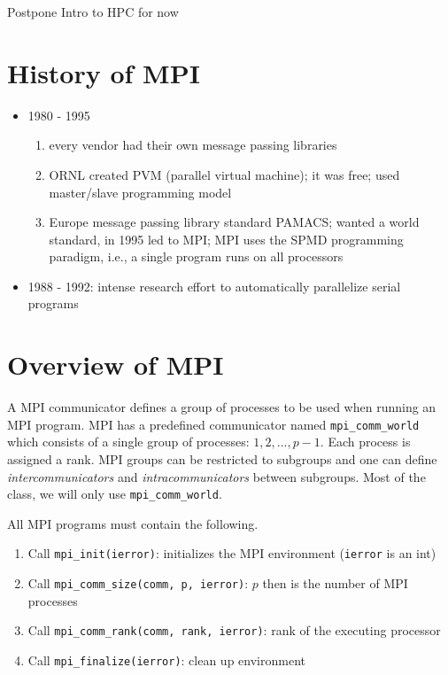 \documentclass[10pt]{article}
\newenvironment{mitemize}
{
  \begin{itemize}
  \setlength{\itemsep}{1pt}
  \setlength{\parskip}{0pt}
  \setlength{\parsep}{0pt}}{\end{itemize}
}
\newenvironment{menumerate}
{
  \begin{enumerate}
  \setlength{\itemsep}{1pt}
  \setlength{\parskip}{0pt}
  \setlength{\parsep}{0pt}}{\end{enumerate}
}
\begin{document}
Postpone Intro to HPC for now

\section{History of MPI}
\begin{mitemize}
  \item 1980 - 1995
  \begin{menumerate}
    \item every vendor had their own message passing libraries
    \item ORNL created PVM (parallel virtual machine); it was free; used master/slave programming model
    \item Europe message passing library standard PAMACS; wanted a world standard, in 1995 led to MPI; MPI uses the SPMD programming paradigm, i.e., a single program runs on all processors
  \end{menumerate}
  \item 1988 - 1992: intense research effort to automatically parallelize serial programs
\end{mitemize}

\section{Overview of MPI}

A MPI communicator defines a group of processes to be used when running an MPI program. MPI has a predefined communicator named \texttt{mpi\_comm\_world} which consists of a single group of processes: $1,2,...,p-1$. Each process is assigned a rank. MPI groups can be restricted to subgroups and one can define \textit{intercommunicators} and \textit{intracommunicators} between subgroups. Most of the class, we will only use \texttt{mpi\_comm\_world}.

All MPI programs must contain the following.
\begin{menumerate}
  \item Call \texttt{mpi\_init(ierror)}: initializes the MPI environment (\texttt{ierror} is an int)
  \item Call \texttt{mpi\_comm\_size(comm, p, ierror)}: $p$ then is the number of MPI processes
  \item Call \texttt{mpi\_comm\_rank(comm, rank, ierror)}: rank of the executing processor
  \item Call \texttt{mpi\_finalize(ierror)}: clean up environment
\end{menumerate}
\end{document}
